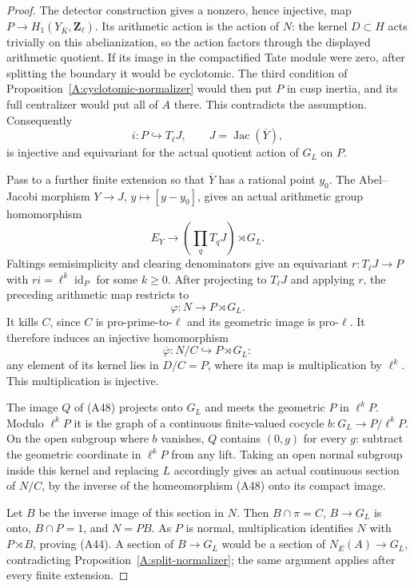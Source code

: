\documentclass[11pt,oneside]{article}
\begin{document}
\begin{proof}
The detector construction gives a nonzero,
hence injective, map
$P\to H_1(Y_{\overline K},\mathbf Z_\ell)$.
Its arithmetic action is the action of $N$:
the kernel $D\subset H$ acts trivially on this
abelianization, so the action factors through
the displayed arithmetic quotient.
If its image in the compactified Tate module
were zero, after splitting the boundary it
would be cyclotomic. The third condition of
Proposition~\ref{A:cyclotomic-normalizer} would
then put $P$ in cusp inertia, and its full
centralizer would put all of $A$ there.
This contradicts the assumption. Consequently
\[
             i:P\hookrightarrow T_\ell J,
       \qquad J=\operatorname{Jac}(\overline Y),
                                                        \tag{A46}
\]
is injective and equivariant for the actual
quotient action of $G_L$ on $P$.

Pass to a further finite extension so that
$\overline Y$ has a rational point $y_0$.
The Abel--Jacobi morphism
$Y\to J$, $y\mapsto[y-y_0]$, gives an actual
arithmetic group homomorphism
\[
                  E_Y\longrightarrow
                  \left(\prod_qT_qJ\right)\rtimes G_L.
\]
Faltings semisimplicity and clearing denominators
give an equivariant $r:T_\ell J\to P$ with
$r i=\ell^k\operatorname{id}_P$ for some $k\ge0$.
After projecting to $T_\ell J$ and applying $r$,
the preceding arithmetic map restricts to
\[
                  \varphi:N\longrightarrow P\rtimes G_L.
                                                        \tag{A47}
\]
It kills $C$, since $C$ is pro-prime-to-$\ell$
and its geometric image is pro-$\ell$. It
therefore induces an injective homomorphism
\[
             \overline\varphi:N/C\hookrightarrow P\rtimes G_L:
                                                        \tag{A48}
\]
any element of its kernel lies in $D/C=P$,
where its map is multiplication by $\ell^k$.
This multiplication is injective.

The image $Q$ of (A48) projects onto $G_L$
and meets the geometric $P$ in $\ell^kP$.
Modulo $\ell^kP$ it is the graph of a
continuous finite-valued cocycle
$b:G_L\to P/\ell^kP$. On the open subgroup
where $b$ vanishes, $Q$ contains $(0,g)$
for every $g$: subtract the geometric
coordinate in $\ell^kP$ from any lift.
Taking an open normal subgroup inside this
kernel and replacing $L$ accordingly gives
an actual continuous section of $N/C$,
by the inverse of the homeomorphism (A48)
onto its compact image.

Let $B$ be the inverse image of this section
in $N$. Then $B\cap\pi=C$, $B\to G_L$
is onto, $B\cap P=1$, and $N=PB$.
As $P$ is normal, multiplication identifies
$N$ with $P\rtimes B$, proving (A44).
A section of $B\to G_L$ would be a section
of $N_E(A)\to G_L$, contradicting
Proposition~\ref{A:split-normalizer}; the same
argument applies after every finite extension.
\end{proof}
\end{document}
